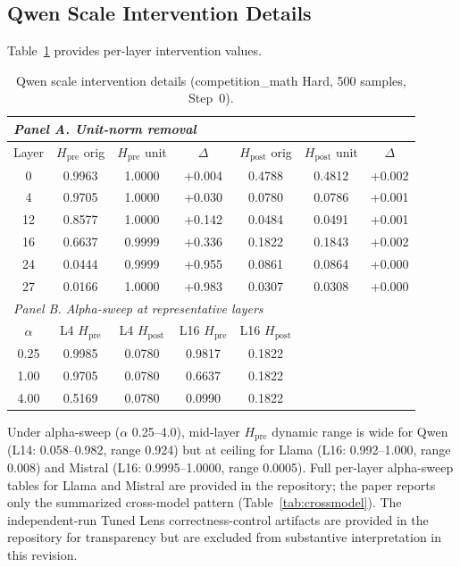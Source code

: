 \documentclass{ieeeaccess}
\newcommand{\Hpre}{H_{\text{pre}}}
\newcommand{\Hpost}{H_{\text{post}}}
\begin{document}
\subsection{Qwen Scale Intervention Details}

Table~\ref{tab:unitnorm_qwen} provides per-layer intervention values.

\begin{table}[!ht]
\centering
\caption{Qwen scale intervention details (competition\_math Hard, 500 samples, Step~0).}
\label{tab:unitnorm_qwen}
\footnotesize
\setlength{\tabcolsep}{2.5pt}
\begin{tabular}{c cc c cc c}
\toprule
\multicolumn{7}{l}{\textit{Panel A. Unit-norm removal}} \\
\midrule
Layer & $\Hpre$ orig & $\Hpre$ unit & $\Delta$ & $\Hpost$ orig & $\Hpost$ unit & $\Delta$ \\
\midrule
0 & 0.9963 & 1.0000 & +0.004 & 0.4788 & 0.4812 & +0.002 \\
4 & 0.9705 & 1.0000 & +0.030 & 0.0780 & 0.0786 & +0.001 \\
12 & 0.8577 & 1.0000 & +0.142 & 0.0484 & 0.0491 & +0.001 \\
16 & 0.6637 & 0.9999 & +0.336 & 0.1822 & 0.1843 & +0.002 \\
24 & 0.0444 & 0.9999 & +0.955 & 0.0861 & 0.0864 & +0.000 \\
27 & 0.0166 & 1.0000 & +0.983 & 0.0307 & 0.0308 & +0.000 \\
\midrule
\multicolumn{7}{l}{\textit{Panel B. Alpha-sweep at representative layers}} \\
\midrule
$\alpha$ & L4 $\Hpre$ & L4 $\Hpost$ & L16 $\Hpre$ & L16 $\Hpost$ & & \\
\midrule
0.25 & 0.9985 & 0.0780 & 0.9817 & 0.1822 & & \\
1.00 & 0.9705 & 0.0780 & 0.6637 & 0.1822 & & \\
4.00 & 0.5169 & 0.0780 & 0.0990 & 0.1822 & & \\
\bottomrule
\end{tabular}
\end{table}

Under alpha-sweep ($\alpha$ 0.25--4.0), mid-layer $\Hpre$ dynamic range is wide for Qwen (L14: 0.058--0.982, range 0.924) but at ceiling for Llama (L16: 0.992--1.000, range 0.008) and Mistral (L16: 0.9995--1.0000, range 0.0005). Full per-layer alpha-sweep tables for Llama and Mistral are provided in the repository; the paper reports only the summarized cross-model pattern (Table~\ref{tab:crossmodel}). The independent-run Tuned Lens correctness-control artifacts are provided in the repository for transparency but are excluded from substantive interpretation in this revision.
\end{document}
